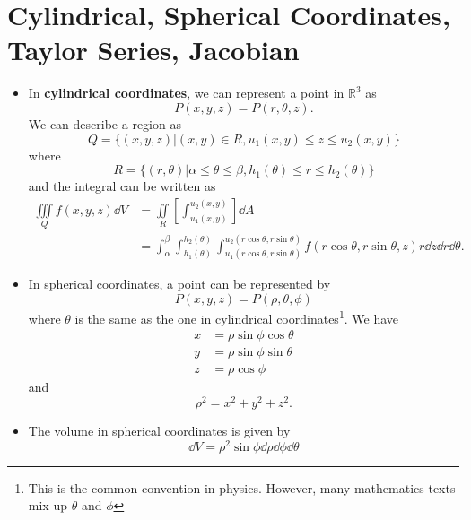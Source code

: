 \section{Cylindrical, Spherical Coordinates, Taylor Series, Jacobian}
\begin{itemize}
    \item In \textbf{cylindrical coordinates}, we can represent a point in $\mathbb{R}^3$ as 
    \begin{equation}
        P(x,y,z) = P(r,\theta,z).
    \end{equation}
    We can describe a region as 
    \begin{equation}
        Q = \{(x,y,z) | (x,y)\in R, u_1(x,y)\le z\le u_2 (x,y)\}
    \end{equation}
    where
    \begin{equation}
        R= \{(r,\theta)|\alpha\le \theta\le \beta, h_1(\theta)\le r\le h_2(\theta)\}
    \end{equation}
    and the integral can be written as 
    \begin{align}
        \iiint\limits_Q f(x,y,z)\dd{V} &=\iint\limits_R \left[\int_{u_1(x,y)}^{u_2(x,y)}\right]\dd{A} \\ 
        &= \int_\alpha^\beta \int_{h_1(\theta)}^{h_2(\theta)}\int_{u_1(r\cos\theta,r\sin\theta)}^{u_2(r\cos\theta,r\sin\theta)}f(r\cos\theta,r\sin\theta,z)r\dd{z}\dd{r}\dd{\theta.} 
    \end{align}
    \item In spherical coordinates, a point can be represented by 
    \begin{equation}
        P(x,y,z)=P(\rho,\theta,\phi)
    \end{equation}
    where $\theta$ is the same as the one in cylindrical coordinates\footnote{This is the common convention in physics. However, many mathematics texts mix up $\theta$ and $\phi$}. We have 
    \begin{align}
        x &= \rho\sin\phi\cos\theta \\ 
        y &= \rho\sin\phi\sin\theta \\ 
        z &= \rho \cos\phi 
    \end{align}
    and 
    \begin{equation}
        \rho^2 = x^2+y^2+z^2.
    \end{equation}
    \item The volume in spherical coordinates is given by 
    \begin{equation}
        \dd{V} = \rho^2 \sin\phi \dd{\rho}\dd{\phi}\dd{\theta}

\end{equation}
\end{itemize}
